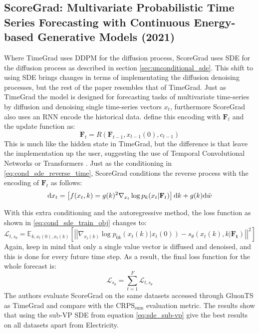 \subsection{ScoreGrad: Multivariate Probabilistic Time Series Forecasting with Continuous Energy-based Generative Models (2021) \cite{yan_scoregrad_2021}} \label{sec:scoregrad}
Where TimeGrad \cite{rasul_autoregressive_2021} uses DDPM \cite{ho_denoising_2020} for the diffusion process, ScoreGrad uses SDE \cite{song_score-based_2021} for the diffusion process as described in section \ref{sec:unconditional_sde}.
This shift to using SDE brings changes in terms of implementating the diffusion denoising processes, but the rest of the paper resembles that of TimeGrad. Just as TimeGrad the model is designed for forecasting tasks of multivariate time-series by diffusion and denoising single time-series vectors $x_t$, furthermore ScoreGrad also uses an RNN encode the historical data. \textcite{yan_scoregrad_2021} define this encoding with $\mathbf{F}_t$ and the update function as:
\begin{equation}
    \mathbf{F}_t = R(\mathbf{F}_{t-1}, x_{t-1}(0), c_{t-1})
\end{equation}
This is much like the hidden state in TimeGrad, but the difference is that \textcite{yan_scoregrad_2021} leave the implementation up the user, suggesting the use of Temporal Convolutional Networks \cite{oord_wavenet_2016} or Transformers \cite{vaswani_attention_2017}.
Just as the conditioning in \eqref{eq:cond_sde_reverse_time}, ScoreGrad conditions the reverse process with the encoding of $\mathbf{F}_t$ as follows:
\begin{equation}
    \mathrm{d} x_t = \left[ f(x_t, k) = g(k)^2 \nabla_{x_t} \log{p_k(x_t|\mathbf{F}_t)} \right] \mathrm{d} k + g(k) \mathrm{d} \bar{w}
\end{equation}

With this extra conditioning and the autoregressive method, the loss function as shown in \ref{eq:cond_sde_train_obj} changes to:
\begin{equation}
    \mathcal{L}_{t,s_\theta} = \mathbb{E}_{k, x_t(0), x_t(k)} \left[\left|\left| \nabla_{x_t(k)} \log{p_{0k}(x_t(k) | x_t(0))} - s_\theta(x_t(k),  k | \mathbf{F_t})\right|\right|^2 \right]    
\end{equation}
Again, keep in mind that only a single value vector is diffused and denoised, and this is done for every future time step. As a result, the final loss function for the whole forecast is:
\begin{equation}
    \mathcal{L}_{s_\theta} = \sum_{t=1}^F \mathcal{L}_{t,s_\theta}
\end{equation}
The authors evaluate ScoreGrad on the same datasets accessed through GluonTS as TimeGrad and compare with the $\text{CRPS}_{\text{sum}}$ evaluation metric. The results show that using the sub-VP SDE from equation \eqref{eq:sde_sub-vp} give the best results on all datasets apart from Electricity. 

